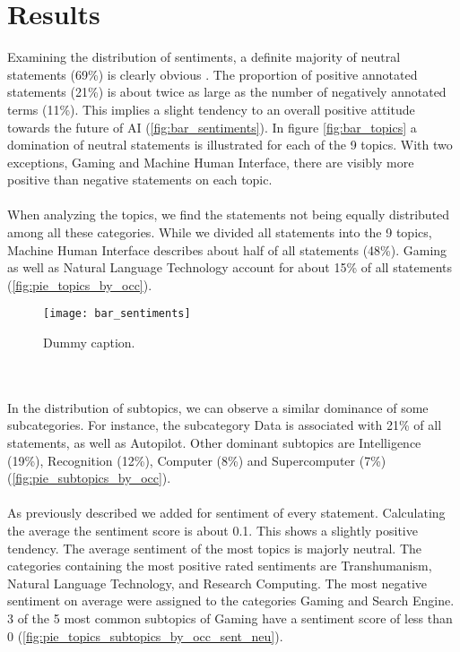 \section{Results}
\label{results}
Examining the distribution of sentiments, a definite majority of neutral statements  (69\%) is clearly obvious . The proportion of positive annotated statements (21\%) is about twice as large as the number of negatively annotated terms (11\%). This implies a slight tendency to an overall positive attitude towards the future of AI (\autoref{fig:bar_sentiments}). In figure \ref{fig:bar_topics} a domination of neutral statements is illustrated for each of the 9 topics. With two exceptions, Gaming and Machine Human Interface, there are visibly more positive than negative statements on each topic.
\\
\\
When analyzing the topics, we find the statements not being equally distributed among all these categories. While we divided all statements into the 9 topics, Machine Human Interface describes about half of all statements (48\%). Gaming as well as Natural Language Technology account for about 15\% of all statements (\autoref{fig:pie_topics_by_occ}).
\begin{figure}[t]
    \centering
    \texttt{[image: bar\_sentiments]}
    \caption{
        Dummy caption.
    }
    \label{fig:bar_sentiments}
\end{figure}
\\
\\
In the distribution of subtopics, we can observe a similar dominance of some subcategories. For instance, the subcategory Data is associated with 21\% of all statements, as well as Autopilot. Other dominant subtopics are Intelligence (19\%), Recognition (12\%), Computer (8\%) and Supercomputer (7\%) (\autoref{fig:pie_subtopics_by_occ}).
\\
\\
As previously described we added for sentiment of every statement. Calculating the average the sentiment score is about 0.1. This shows a slightly positive tendency. The average sentiment of the most topics is majorly neutral. The categories containing the most positive rated sentiments are Transhumanism, Natural Language Technology, and Research Computing. The most negative sentiment on average were assigned to the categories Gaming and Search Engine. 3 of the 5 most common subtopics of Gaming have a sentiment score of less than 0 (\autoref{fig:pie_topics_subtopics_by_occ_sent_neu}).
